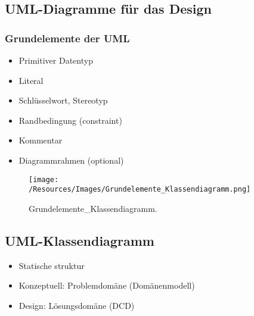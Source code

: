 \documentclass[../ZF_SWEN1.tex]{subfiles}
\begin{document}
\subsection{UML-Diagramme für das Design}
\subsubsection{Grundelemente der UML}
\begin{itemize}
	\item Primitiver Datentyp
	\item Literal
	\item Schlüsselwort, Stereotyp
	\item Randbedingung (constraint)
	\item Kommentar
	\item Diagrammrahmen (optional)
\end{itemize}

\begin{figure}[H]
\centering
\texttt{[image: /Resources/Images/Grundelemente\_Klassendiagramm.png]}
\caption{\label{fig:Grundelemente_Klassendiagramm}Grundelemente\_Klassendiagramm.}
\end{figure}

\subsection{UML-Klassendiagramm}
\begin{itemize}
	\item Statische struktur
	\item Konzeptuell: Problemdomäne (Domänenmodell)
	\item Design: Lösungsdomäne (DCD)
\end{itemize}
\end{document}
